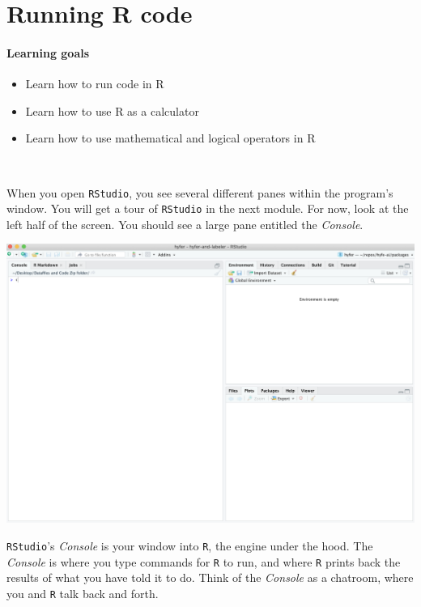 \documentclass[
]{book}
\providecommand{\tightlist}{%
  \setlength{\itemsep}{0pt}\setlength{\parskip}{0pt}}
\begin{document}
\hypertarget{running-r-code}{%
\chapter{Running R code}\label{running-r-code}}

\hypertarget{learning-goals}{%
\subsubsection*{Learning goals}\label{learning-goals}}

\begin{itemize}
\tightlist
\item
  Learn how to run code in R
\item
  Learn how to use R as a calculator
\item
  Learn how to use mathematical and logical operators in R
\end{itemize}

~

When you open \texttt{RStudio}, you see several different panes within the program's window. You will get a tour of \texttt{RStudio} in the next module. For now, look at the left half of the screen. You should see a large pane entitled the \emph{Console}.

\includegraphics{img/rstudio_firstopen.png}

\texttt{RStudio}'s \emph{Console} is your window into \texttt{R}, the engine under the hood. The \emph{Console} is where you type commands for \texttt{R} to run, and where \texttt{R} prints back the results of what you have told it to do. Think of the \emph{Console} as a chatroom, where you and \texttt{R} talk back and forth.
\end{document}
